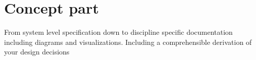 \section{Concept part}
From system level specification down to discipline specific documentation including diagrams and visualizations. Including a comprehensible derivation of your design decisions